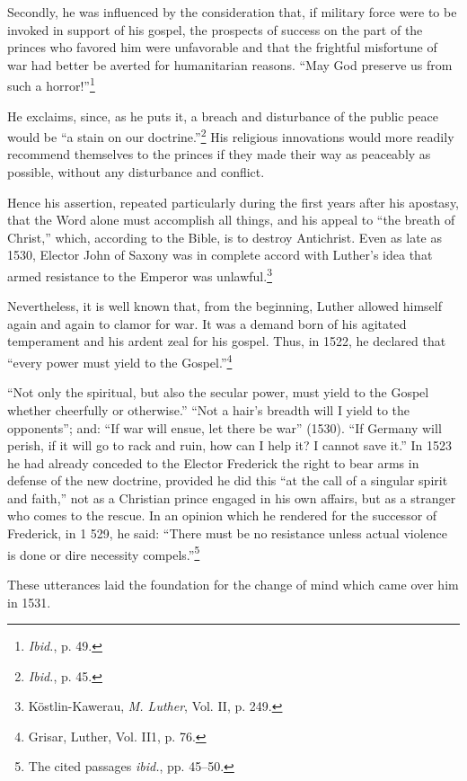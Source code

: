 Secondly, he was influenced by the consideration that, if military
force were to be invoked in support of his gospel, the prospects of
success on the part of the princes who favored him were unfavorable
and that the frightful misfortune of war had better be averted for
humanitarian reasons. “May God preserve us from such a horror!”\footnote{\textit{Ibid.}, p. 49.}

He exclaims, since, as he puts it, a breach and disturbance of the
public peace would be “a stain on our doctrine.”\footnote{\textit{Ibid.}, p. 45.}
His religious
innovations would more readily recommend themselves to the princes
if they made their way as peaceably as possible, without any disturbance
and conflict.

Hence his assertion, repeated particularly during the first years
after his apostasy, that the Word alone must accomplish all
things, and his appeal to “the breath of Christ,” which, according to
the Bible, is to destroy Antichrist. Even as late as 1530, Elector John
of Saxony was in complete accord with Luther’s idea that armed resistance
to the Emperor was unlawful.\footnote{Köstlin-Kawerau, \textit{M. Luther}, Vol. II, p. 249.}


Nevertheless, it is well known that, from the beginning, Luther
allowed himself again and again to clamor for war. It was a demand
born of his agitated temperament and his ardent zeal for his gospel.
Thus, in 1522, he declared that “every power must yield to the Gospel.”\footnote{Grisar, Luther, Vol. II1, p. 76.}

“Not only the spiritual, but also the secular power, must yield
to the Gospel whether cheerfully or otherwise.” “Not a hair’s breadth
will I yield to the opponents”; and: “If war will ensue, let there be
war” (1530). “If Germany will perish, if it will go to rack and
ruin, how can I help it? I cannot save it.” In 1523 he had already
conceded to the Elector Frederick the right to bear arms in defense
of the new doctrine, provided he did this “at the call of a singular
spirit and faith,” not as a Christian prince engaged in his own affairs,
but as a stranger who comes to the rescue. In an opinion which he rendered
for the successor of Frederick, in 1 529, he said: “There must be
no resistance unless actual violence is done or dire necessity compels.”\footnote{The cited passages \textit{ibid.}, pp. 45--50.}


These utterances laid the foundation for the change of mind which
came over him in 1531.

